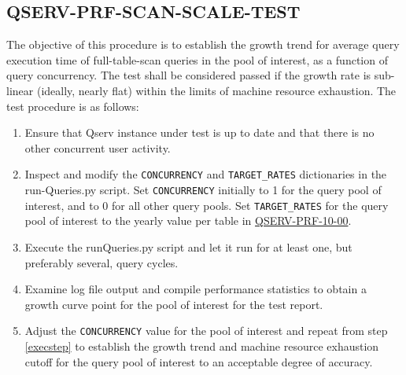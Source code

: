 \subsection{QSERV-PRF-SCAN-SCALE-TEST}
\label{qserv-prf-scan-scale-test}

The objective of this procedure is to establish the growth trend for average query execution time of
full-table-scan queries in the pool of interest, as a function of query concurrency.  The test shall
be considered passed if the growth rate is sub-linear (ideally, nearly flat) within the limits of
machine resource exhaustion.  The test procedure is as follows:

\begin{enumerate}

  \item{Ensure that Qserv instance under test is up to date and that there is no other concurrent
  user activity.}

  \item{Inspect and modify the \texttt{CONCURRENCY} and \texttt{TARGET\_RATES} dictionaries in the 
  run-Queries.py script. Set \texttt{CONCURRENCY} initially to 1 for the query pool of interest, and to 0
  for all other query pools.  Set \texttt{TARGET\_RATES} for the query pool of interest to the yearly value
  per table in \hyperref[qserv-prf-10-00]{\textsc{QSERV-PRF-10-00}}}.

  \item{\label{execstep}Execute the runQueries.py script and let it run for at least one, but preferably
  several, query cycles.}

  \item{Examine log file output and compile performance statistics to obtain a growth curve point
  for the pool of interest for the test report.}

  \item{Adjust the \texttt{CONCURRENCY} value for the pool of interest and repeat from step \ref{execstep}
  to establish the growth trend and machine resource exhaustion cutoff for the query pool of interest to an 
  acceptable degree of accuracy.} 

\end{enumerate}
